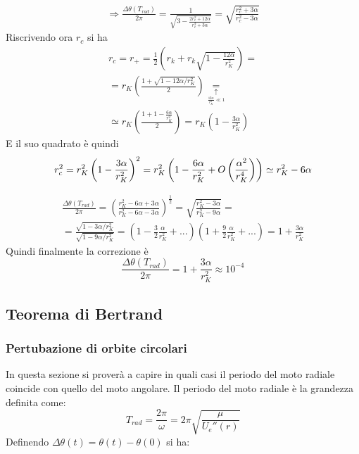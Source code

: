 \documentclass[Main.tex]{subfiles}
\begin{document}
\begin{tema}
\begin{gather*}
	\Rightarrow \frac{\Delta \theta (T_{rad})}{2 \pi} = \frac{1}{\sqrt{3 - \frac{2 r_c^2 + 12 \alpha}{r^2_c +3 \alpha}}}=
	\boxed{ \sqrt{\frac{r_c^2 + 3 \alpha}{r_c^2- 3 \alpha }}}
\end{gather*}
Riscrivendo ora $r_c$ si ha
\begin{gather}
	r_c= r_+= \frac{1}{2} \left( r_k + r_k \sqrt{1- \frac{12 \alpha}{r_K^2}} \right)=\\
	= r_K \left( \frac{1 + \sqrt{1- 12 \alpha /r_K^2}}{2} \right) \underset{\underset{ \frac{12 \alpha}{r_K^2} \ll 1}{\uparrow}}{=}\\
	\simeq r_K \left( \frac{1+ 1 - \frac{6 \alpha}{r_K^2}}{2} \right) = r_K \left( 1- \frac{3 \alpha}{r_K^2}\right)
\end{gather}
E il suo quadrato è quindi
\begin{gather}\notag
	r^2_c = r_K^2 \left( 1 - \frac{3 \alpha}{r_K^2} \right)^2 = r_K^2 \left( 1- \frac{6 \alpha}{r_K^2} + O\left( \frac{\alpha^2}{r_K^4} \right) \right) \simeq r^2_K - 6 \alpha
\end{gather}

\newpage
\begin{gather*}
	\frac{\Delta \theta (T_{rad})}{2 \pi} = \left( \frac{r_K^2 - 6 \alpha + 3 \alpha}{r_K^2 - 6 \alpha - 3 \alpha} \right)^\frac{1}{2} = \sqrt{ \frac{r_K^2 - 3 \alpha}{r^2_K - 9 \alpha}} =\\
	= \frac{\sqrt{1- 3 \alpha/r_K^2}}{\sqrt{1- 9 \alpha /r_K^2}} = \left( 1- \frac{3}{2} \frac{\alpha}{r_K^2} +... \right) \left( 1+ \frac{9}{2} \frac{\alpha}{r_K^2}+... \right)= 1 + \frac{3 \alpha}{r_K^2}
\end{gather*}
Quindi finalmente la correzione è 
\begin{equation}
	\frac{\Delta \theta (T_{rad}) }{ 2 \pi} = 1 + \frac{3 \alpha}{r_K^2} \approx 10^{-4}
\end{equation}
\end{tema}





\newpage
\subsection{Teorema di Bertrand}

\subsubsection{Pertubazione di orbite circolari}
In questa sezione si proverà a capire in quali casi il periodo del moto radiale coincide con quello del moto angolare. Il periodo del moto radiale è la grandezza definita come:
\begin{equation}
	T_{rad} = \frac{ 2 \pi}{ \omega} = 2 \pi \sqrt{ \frac{\mu}{U_e''(r)}}
\end{equation}
Definendo $\Delta \theta (t) = \theta(t) - \theta(0)$ si ha:
\end{document}
